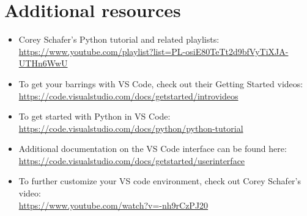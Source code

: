 \documentclass{UNB-Physics-Assignment}
\begin{document}
\newpage{}
\section*{Additional resources}

\begin{itemize}
  \item Corey Schafer's Python tutorial and related playlists:\\
  \href{https://www.youtube.com/playlist?list=PL-osiE80TeTt2d9bfVyTiXJA-UTHn6WwU}{https://www.youtube.com/playlist?list=PL-osiE80TeTt2d9bfVyTiXJA-UTHn6WwU}
  \item To get your barrings with VS Code, check out their Getting Started videos:\\
  \href{https://code.visualstudio.com/docs/getstarted/introvideos}{https://code.visualstudio.com/docs/getstarted/introvideos}

  \item To get started with Python in VS Code:\\
  \href{https://code.visualstudio.com/docs/python/python-tutorial}{https://code.visualstudio.com/docs/python/python-tutorial}

  \item Additional documentation on the VS Code interface can be found here:\\
  \href{https://code.visualstudio.com/docs/getstarted/userinterface}{https://code.visualstudio.com/docs/getstarted/userinterface}

  \item To further customize your VS code environment, check out Corey Schafer's video:\\
  \href{https://www.youtube.com/watch?v=-nh9rCzPJ20}{https://www.youtube.com/watch?v=-nh9rCzPJ20}
\end{itemize}
\end{document}
